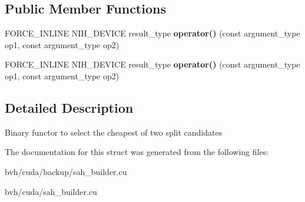 \subsection*{\-Public \-Member \-Functions}
\begin{DoxyCompactItemize}
\item 
\hypertarget{structnih_1_1cuda_1_1sah_1_1_best__split__functor_a18b4c0870a24d8589c8164557e7a08d5}{
\-F\-O\-R\-C\-E\-\_\-\-I\-N\-L\-I\-N\-E \-N\-I\-H\-\_\-\-D\-E\-V\-I\-C\-E result\-\_\-type {\bfseries operator()} (const argument\-\_\-type op1, const argument\-\_\-type op2)}
\label{structnih_1_1cuda_1_1sah_1_1_best__split__functor_a18b4c0870a24d8589c8164557e7a08d5}

\item 
\hypertarget{structnih_1_1cuda_1_1sah_1_1_best__split__functor_a18b4c0870a24d8589c8164557e7a08d5}{
\-F\-O\-R\-C\-E\-\_\-\-I\-N\-L\-I\-N\-E \-N\-I\-H\-\_\-\-D\-E\-V\-I\-C\-E result\-\_\-type {\bfseries operator()} (const argument\-\_\-type op1, const argument\-\_\-type op2)}
\label{structnih_1_1cuda_1_1sah_1_1_best__split__functor_a18b4c0870a24d8589c8164557e7a08d5}

\end{DoxyCompactItemize}


\subsection{\-Detailed \-Description}
\-Binary functor to select the cheapest of two split candidates 

\-The documentation for this struct was generated from the following files\-:\begin{DoxyCompactItemize}
\item 
bvh/cuda/backup/sah\-\_\-builder.\-cu\item 
bvh/cuda/sah\-\_\-builder.\-cu\end{DoxyCompactItemize}
